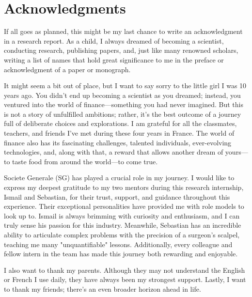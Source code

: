\cleardoublepage
{}
{}
\chapter*{Acknowledgments}
\vspace{1.0in}
If all goes as planned, this might be my last chance to write an acknowledgment in a research report. As a child, I always dreamed of becoming a scientist, conducting research, publishing papers, and, just like many renowned scholars, writing a list of names that hold great significance to me in the preface or acknowledgment of a paper or monograph.

It might seem a bit out of place, but I want to say sorry to the little girl I was 10 years ago. You didn't end up becoming a scientist as you dreamed; instead, you ventured into the world of finance—something you had never imagined. But this is not a story of unfulfilled ambitions; rather, it’s the best outcome of a journey full of deliberate choices and explorations. I am grateful for all the classmates, teachers, and friends I’ve met during these four years in France. The world of finance also has its fascinating challenges, talented individuals, ever-evolving technologies, and, along with that, a reward that allows another dream of yours—to taste food from around the world—to come true.

Societe Generale (SG) has played a crucial role in my journey. I would like to express my deepest gratitude to my two mentors during this research internship, Ismail and Sebastian, for their trust, support, and guidance throughout this experience. Their exceptional personalities have provided me with role models to look up to. Ismail is always brimming with curiosity and enthusiasm, and I can truly sense his passion for this industry. Meanwhile, Sebastian has an incredible ability to articulate complex problems with the precision of a surgeon's scalpel, teaching me many "unquantifiable" lessons. Additionally, every colleague and fellow intern in the team has made this journey both rewarding and enjoyable.

I also want to thank my parents. Although they may not understand the English or French I use daily, they have always been my strongest support. Lastly, I want to thank my friends; there’s an even broader horizon ahead in life.


